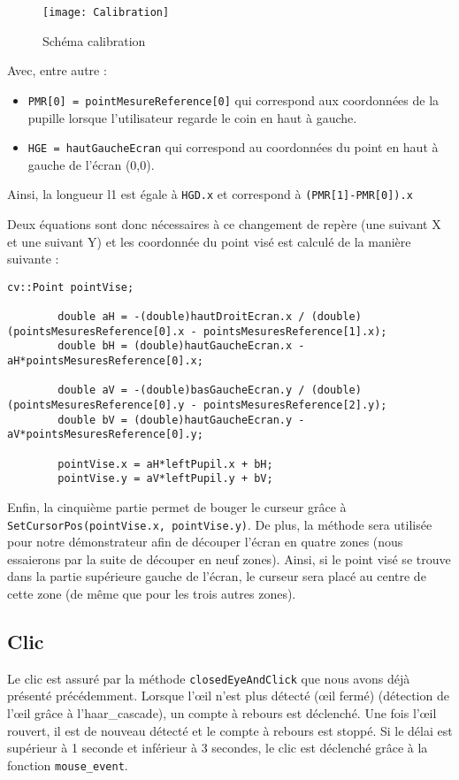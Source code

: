 \begin{figure}[H]
  \centering
  \texttt{[image: Calibration]}
  \caption{Schéma calibration}
  \label{fig:calib}
\end{figure}

Avec, entre autre :
\begin{itemize}[font=\tiny, label=]
\item \lstinline-PMR[0] = pointMesureReference[0]- qui correspond aux coordonnées de la pupille lorsque l’utilisateur regarde le coin en haut à gauche.
\item \lstinline-HGE = hautGaucheEcran- qui correspond au coordonnées du point en haut à gauche de l’écran (0,0).
\end{itemize}

Ainsi, la longueur l1 est égale à \lstinline=HGD.x= et correspond à \lstinline=(PMR[1]-PMR[0]).x=

Deux équations sont donc nécessaires à ce changement de repère (une suivant X et une suivant Y) et les coordonnée du point visé est calculé de la manière suivante :

\begin{lstlisting}
cv::Point pointVise;

		double aH = -(double)hautDroitEcran.x / (double)(pointsMesuresReference[0].x - pointsMesuresReference[1].x);
		double bH = (double)hautGaucheEcran.x - aH*pointsMesuresReference[0].x;

		double aV = -(double)basGaucheEcran.y / (double)(pointsMesuresReference[0].y - pointsMesuresReference[2].y);
		double bV = (double)hautGaucheEcran.y - aV*pointsMesuresReference[0].y;

		pointVise.x = aH*leftPupil.x + bH;
		pointVise.y = aV*leftPupil.y + bV;
\end{lstlisting}

Enfin, la cinquième partie permet de bouger le curseur grâce à \lstinline=SetCursorPos(pointVise.x, pointVise.y)=. De plus, la méthode  sera utilisée pour notre démonstrateur afin de découper l’écran en quatre zones (nous essaierons par la suite de découper en neuf zones). Ainsi, si le point visé se trouve dans la partie supérieure gauche de l’écran, le curseur sera placé au centre de cette zone (de même que pour les trois autres zones). 

\subsection{Clic}

Le clic est assuré par la méthode \lstinline=closedEyeAndClick= que nous avons déjà présenté précédemment. Lorsque l’œil n’est plus détecté (œil fermé) (détection de l’œil grâce à l’haar\_cascade), un compte à rebours est déclenché. Une fois l’œil rouvert, il est de nouveau détecté et le compte à rebours est stoppé. Si le délai est supérieur à 1 seconde et inférieur à 3 secondes, le clic est déclenché grâce à la fonction \lstinline=mouse_event=.

